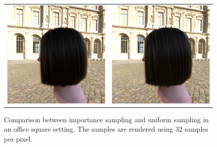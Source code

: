 \documentclass[11pt,a4paper]{report}
\begin{document}
\begin{figure}[h]
\begin{center}
\begin{tabular}{cc}
\includegraphics[scale=0.16]{realworld/venice/deon_brown2_32.png} &
\includegraphics[scale=0.16]{realworld/venice/uniform_brown2_32.png} \\

\end{tabular}
\caption{Comparison between importance sampling and uniform sampling in an office square setting. The samples are rendered using 32 samples per pixel.}
\label{fig_venice}
\end{center}
\end{figure}
\end{document}
